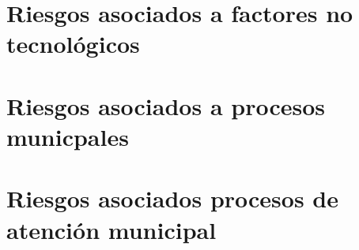 
\section{Riesgos asociados a factores no tecnológicos}

\section{Riesgos asociados a procesos municpales}



\section{Riesgos asociados procesos de atención municipal}






